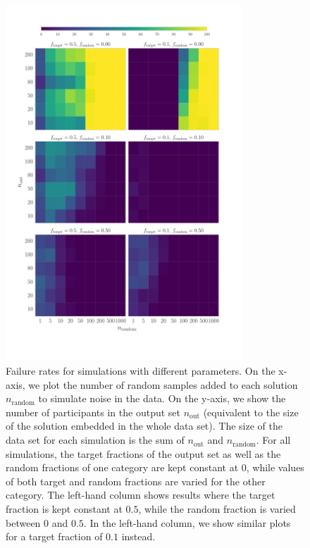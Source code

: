\documentclass[12pt]{article}
\begin{document}
\begin{figure}[htbp]
\begin{center}
\includegraphics[width=3.5in]{f1.pdf}
\caption{Failure rates for simulations with different parameters. On the x-axis, we plot the number of random samples added to each solution $n_\mathrm{random}$ to simulate noise in the data. On the y-axis, we show the number of participants in the output set $n_\mathrm{out}$ (equivalent to the size of the solution embedded in the whole data set). The size of the data set for each simulation is the sum of $n_\mathrm{out}$ and $n_\mathrm{random}$. For all simulations, the target fractions of the output set as well as the random fractions of one category are kept constant at $0$, while values of both target and random fractions are varied for the other category. The left-hand column shows results where the target fraction is kept constant at $0.5$, while the random fraction is varied between $0$ and $0.5$. In the left-hand column, we show similar plots for a target fraction of $0.1$ instead.} 
\label{fig:experiments1}
\end{center}
\end{figure}

\clearpage
\end{document}
